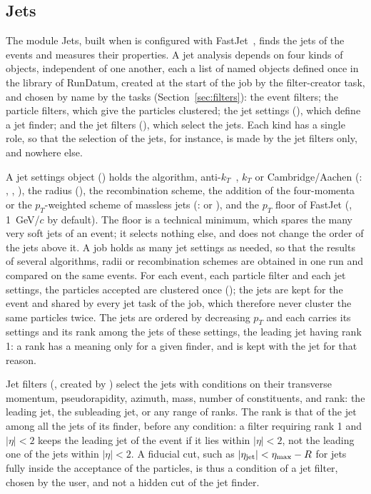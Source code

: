 \subsection{Jets}
\label{sec:jets}

The module Jets, built when \Datum{} is configured with FastJet~\cite{Cacciari:2011ma}, finds the jets of the events and
measures their properties. A jet analysis depends on four kinds of objects, independent of one another, each a list of
named objects defined once in the library of RunDatum, created at the start of the job by the filter-creator task, and
chosen by name by the tasks (Section~\ref{sec:filters}): the event filters; the particle filters, which give the
particles clustered; the jet settings (), which define a jet finder; and the jet filters
(), which select the jets. Each kind has a single role, so that the selection of the jets, for
instance, is made by the jet filters only, and nowhere else.

A jet settings object () holds the algorithm, anti-$k_T$~\cite{Cacciari:2008gp}, $k_T$ or
Cambridge/Aachen (: , , ), the radius (), the recombination
scheme, the addition of the four-momenta or the $p_T$-weighted scheme of massless jets (:
 or ), and the $p_T$ floor of FastJet (, 1~GeV/$c$ by default). The floor is a
technical minimum, which spares the many very soft jets of an event; it selects nothing else, and does not change the
order of the jets above it. A job holds as many jet settings as needed, so that the results of several algorithms,
radii or recombination schemes are obtained in one run and compared on the same events. For each event, each particle
filter and each jet settings, the particles accepted are clustered once (); the jets are kept for
the event and shared by every jet task of the job, which therefore never cluster the same particles twice. The jets
are ordered by decreasing $p_T$ and each carries its settings and its rank among the jets of these settings, the
leading jet having rank 1: a rank has a meaning only for a given finder, and is kept with the jet for that reason.

Jet filters (, created by ) select the jets with conditions on their transverse
momentum, pseudorapidity, azimuth, mass, number of constituents, and rank: the leading jet, the subleading jet, or any
range of ranks. The rank is that of the jet among all the jets of its finder, before any condition: a filter requiring
rank 1 and $|\eta| < 2$ keeps the leading jet of the event if it lies within $|\eta| < 2$, not the leading one of the
jets within $|\eta|<2$. A fiducial cut, such as $|\eta_{\rm jet}| < \eta_{\max} - R$ for jets fully inside the
acceptance of the particles, is thus a condition of a jet filter, chosen by the user, and not a hidden cut of the jet
finder.

